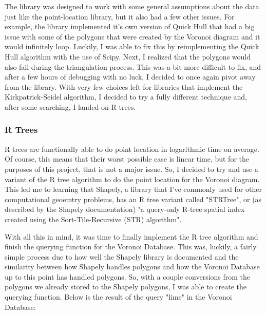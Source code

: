 \documentclass{article}
\begin{document}
\noindent
The library was designed to work with some general assumptions about the data just like the point-location library, but it also had a few other issues. For example, the library implemented it's own version of Quick Hull that had a big issue with some of the polygons that were created by the Voronoi diagram and it would infinitely loop. Luckily, I was able to fix this by reimplementing the Quick Hull algorithm with the use of Scipy. Next, I realized that the polygons would also fail during the triangulation process. This was a bit more difficult to fix, and after a few hours of debugging with no luck, I decided to once again pivot away from the library. With very few choices left for libraries that implement the Kirkpatrick-Seidel algorithm, I decided to try a fully different technique and, after some searching, I landed on R trees. 

\subsubsection{R Trees}
R trees are functionally able to do point location in logarithmic time on average.
Of course, this means that their worst possible case is linear time, but for the purposes
of this project, that is not a major issue. So, I decided to try and use a variant of the 
R tree algorithm to do the point location for the Voronoi diagram. This led me to learning
that Shapely, a library that I've commonly used for other computational geoemtry problems,
has an R tree variant called "STRTree", or (as described by the Shapely documentation) 
"a query-only R-tree spatial index created using the Sort-Tile-Recursive (STR) algorithm"\cite{shapelySTRTree}\cite{strAlgorithm}.
\newline

\noindent
With all this in mind, it was time to finally implement the R tree algorithm and finish
the querying function for the Voronoi Database. This was, luckily, a fairly simple process
due to how well the Shapely library is documented and the similarity between how Shapely
handles polygons and how the Voronoi Database up to this point has handled polygons. So,
with a couple conversions from the polygons we already stored to the Shapely polygons, I was
able to create the querying function. Below is the result of the query "lime" in the Voronoi
Database:
\end{document}
